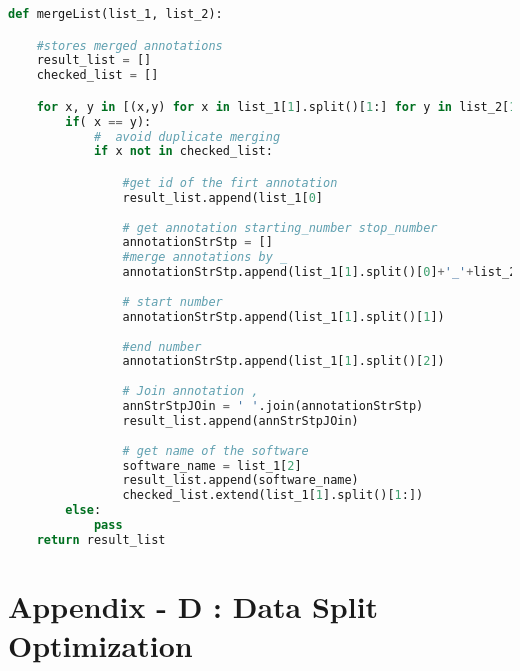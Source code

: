 \begin{lstlisting}[language=python,frame=tb,caption={Function that merges software usage and purpose labels},label=lst:useless]
def mergeList(list_1, list_2):

	#stores merged annotations
	result_list = []
	checked_list = []

	for x, y in [(x,y) for x in list_1[1].split()[1:] for y in list_2[1].split()[1:]]:
		if( x == y):
			#  avoid duplicate merging 
			if x not in checked_list:

				#get id of the firt annotation 
				result_list.append(list_1[0]
					
				# get annotation starting_number stop_number 
				annotationStrStp = []				
				#merge annotations by _
				annotationStrStp.append(list_1[1].split()[0]+'_'+list_2[1].split()[0].split('_')[1])
				
				# start number
				annotationStrStp.append(list_1[1].split()[1])
				
				#end number
				annotationStrStp.append(list_1[1].split()[2])             
				
				# Join annotation , 
				annStrStpJOin = ' '.join(annotationStrStp) 
				result_list.append(annStrStpJOin)
				
				# get name of the software
				software_name = list_1[2]
				result_list.append(software_name)
				checked_list.extend(list_1[1].split()[1:])    
		else:
			pass
	return result_list


\end{lstlisting}




\chapter{Appendix - D : Data Split Optimization}
\label{ch:datasplit}

